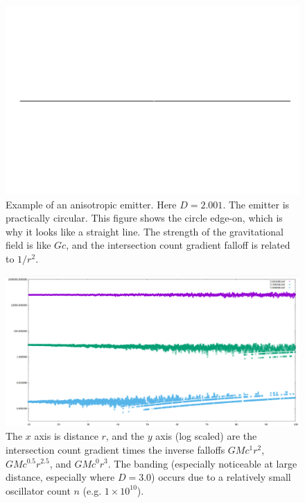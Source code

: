 \documentclass[12pt]{article}
\begin{document}
\begin{figure} 
\centering
  \includegraphics[width = 5 in]{2.png}
  \caption{
Example of an anisotropic emitter.
Here $D = 2.001$. 
The emitter is practically circular. 
This figure shows the circle edge-on, which is why it looks like a straight line.
The strength of the gravitational field is like $Gc$, and the intersection count gradient falloff is related to $1/r^2$.
}
\end{figure}













\begin{figure} 
\centering
  \includegraphics[width = 6 in]{multi_plot.png}
  \caption{
The $x$ axis is distance $r$, and the $y$ axis (log scaled) are the intersection count gradient times the inverse falloffs $GM c^{1} r^2$, $GM c^{0.5} r^{2.5}$, and $GM c^0 r^3$.
The banding (especially noticeable at large distance, especially where $D = 3.0$) occurs due to a relatively small oscillator count $n$ (e.g. $1 \times 10^{10}$).
}
\end{figure}
\end{document}
